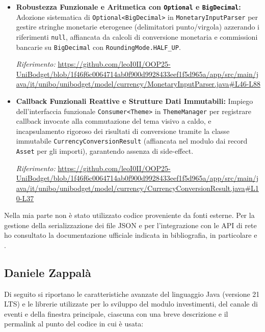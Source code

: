 \documentclass[11pt,a4paper,openright]{report}
\begin{document}
\begin{itemize}[itemsep=5pt,topsep=3pt]
  \item \textbf{Robustezza Funzionale e Aritmetica con \texttt{Optional} e \texttt{BigDecimal}:} Adozione sistematica di \texttt{Optional<BigDecimal>} in \texttt{MonetaryInputParser} per gestire stringhe monetarie eterogenee (delimitatori punto/virgola) azzerando i riferimenti \texttt{null}, affiancata da calcoli di conversione monetaria e commissioni bancarie su \texttt{BigDecimal} con \texttt{RoundingMode.HALF\_UP}.
  \par\emph{Riferimento:} \url{https://github.com/leoI0II/OOP25-UniBodget/blob/1f46f6c0064714ab0f900d9928433eef1f5d965a/app/src/main/java/it/unibo/unibodget/model/currency/MonetaryInputParser.java#L46-L88}

  \item \textbf{Callback Funzionali Reattive e Strutture Dati Immutabili:} Impiego dell'interfaccia funzionale \texttt{Consumer<Theme>} in \texttt{ThemeManager} per registrare callback invocate alla commutazione del tema visivo a caldo, e incapsulamento rigoroso dei risultati di conversione tramite la classe immutabile \texttt{CurrencyConversionResult} (affiancata nel modulo dai record \texttt{Asset} per gli importi), garantendo assenza di side-effect.
  \par\emph{Riferimento:} \url{https://github.com/leoI0II/OOP25-UniBodget/blob/1f46f6c0064714ab0f900d9928433eef1f5d965a/app/src/main/java/it/unibo/unibodget/model/currency/CurrencyConversionResult.java#L10-L37}
\end{itemize}

\noindent
Nella mia parte non è stato utilizzato codice proveniente da fonti esterne. Per la gestione della serializzazione dei file JSON e per l'integrazione con le API di rete ho consultato la documentazione ufficiale indicata in bibliografia, in particolare \cite{Jackson} e \cite{OracleHttpClient}.

\clearpage
\subsection{Daniele Zappalà}

Di seguito si riportano le caratteristiche avanzate del linguaggio Java (versione 21 LTS) e le librerie utilizzate per lo sviluppo del modulo investimenti, del canale di eventi e della finestra principale, ciascuna con una breve descrizione e il permalink al punto del codice in cui è usata:
\end{document}
